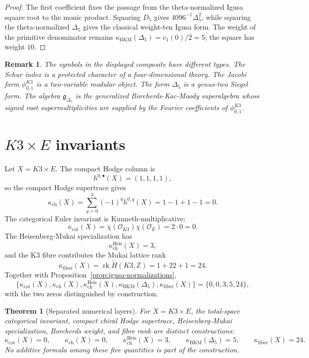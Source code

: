 \documentclass[11pt]{article}
\newtheorem{theorem}{Theorem}
\newtheorem*{remark}{Remark}
\providecommand{\Z}{\mathbb{Z}}
\providecommand{\cO}{\mathcal{O}}
\providecommand{\fg}{\mathfrak{g}}
\providecommand{\kcat}{\kappa_{\mathrm{cat}}}
\providecommand{\kch}{\kappa_{\mathrm{ch}}}
\providecommand{\kBKM}{\kappa_{\mathrm{BKM}}}
\providecommand{\kfib}{\kappa_{\mathrm{fiber}}}
\begin{document}
\begin{proof}
The first coefficient fixes the passage from the theta-normalized
Igusa square root to the monic product. Squaring \(D_5\) gives
\(4096^{-1}\Delta_5^2\), while squaring the theta-normalized
\(\Delta_5\) gives the classical weight-ten Igusa form. The weight of
the primitive denominator remains
\(\kBKM(\Delta_5)=c_1(0)/2=5\); the square has weight \(10\).
\end{proof}

\begin{remark}
The symbols in the displayed composite have different types. The Schur
index is a protected character of a four-dimensional theory. The Jacobi
form \(\phi_{0,1}^{K3}\) is a two-variable modular object. The form
\(\Delta_5\) is a genus-two Siegel form. The algebra
\(\fg_{\Delta_5}\) is the generalized Borcherds-Kac-Moody
superalgebra whose signed root supermultiplicities are supplied by the
Fourier coefficients of \(\phi_{0,1}^{K3}\).
\end{remark}

\section{\texorpdfstring{$K3\times E$}{K3xE} invariants}

Let \(X=K3\times E\). The compact Hodge column is
\[
  h^{0,\bullet}(X)=(1,1,1,1),
\]
so the compact Hodge supertrace gives
\[
  \kch(X)=\sum_{q=0}^{3}(-1)^qh^{0,q}(X)=1-1+1-1=0.
\]
The categorical Euler invariant is Kunneth-multiplicative:
\[
  \kcat(X)=\chi(\cO_{K3})\chi(\cO_E)=2\cdot0=0.
\]
The Heisenberg-Mukai specialization has
\[
  \kch^{\mathrm{Heis}}(X)=3,
\]
and the K3 fibre contributes the Mukai lattice rank
\[
  \kfib(X)=\operatorname{rk}\widetilde H(K3,\Z)=1+22+1=24.
\]
Together with Proposition~\ref{prop:igusa-normalizations},
\[
  \{\kcat(X),\kch(X),\kch^{\mathrm{Heis}}(X),
  \kBKM(\Delta_5),\kfib(X)\}
  =
  \{0,0,3,5,24\},
\]
with the two zeros distinguished by construction.

\begin{theorem}[Separated numerical layers]
\label{thm:separated-numerical-layers}
For \(X=K3\times E\), the total-space categorical invariant, compact
chiral Hodge supertrace, Heisenberg-Mukai specialization, Borcherds
weight, and fibre rank are distinct constructions:
\[
  \kcat(X)=0,\qquad
  \kch(X)=0,\qquad
  \kch^{\mathrm{Heis}}(X)=3,\qquad
  \kBKM(\Delta_5)=5,\qquad
  \kfib(X)=24.
\]
No additive formula among these five quantities is part of the
construction.
\end{theorem}
\end{document}
